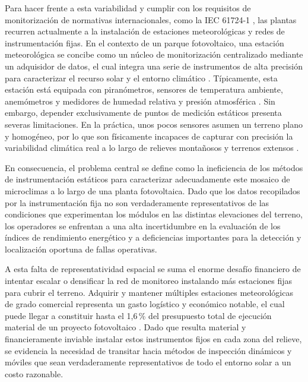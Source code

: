 \documentclass[../../General.tex]{subfiles}
\begin{document}
Para hacer frente a esta variabilidad y cumplir con los requisitos de monitorización de normativas internacionales, como la IEC 61724-1 \citep{IEC61724-1_2021}, las plantas recurren actualmente a la instalación de estaciones meteorológicas y redes de instrumentación fijas. En el contexto de un parque fotovoltaico, una estación meteorológica se concibe como un núcleo de monitorización centralizado mediante un adquisidor de datos, el cual integra una serie de instrumentos de alta precisión para caracterizar el recurso solar y el entorno climático \citep{Anatrac}. Típicamente, esta estación está equipada con piranómetros, sensores de temperatura ambiente, anemómetros y medidores de humedad relativa y presión atmosférica \citep{ProyectoEjecutivo2024}. Sin embargo, depender exclusivamente de puntos de medición estáticos presenta severas limitaciones. En la práctica, unos pocos sensores asumen un terreno plano y homogéneo, por lo que son físicamente incapaces de capturar con precisión la variabilidad climática real a lo largo de relieves montañosos y terrenos extensos \citep{Salinas2025}.

En consecuencia, el problema central se define como la ineficiencia de los métodos de instrumentación estáticos para caracterizar adecuadamente este mosaico de microclimas a lo largo de una planta fotovoltaica. Dado que los datos recopilados por la instrumentación fija no son verdaderamente representativos de las condiciones que experimentan los módulos en las distintas elevaciones del terreno, los operadores se enfrentan a una alta incertidumbre en la evaluación de los índices de rendimiento energético y a deficiencias importantes para la detección y localización oportuna de fallas operativas.

A esta falta de representatividad espacial se suma el enorme desafío financiero de intentar escalar o densificar la red de monitoreo instalando más estaciones fijas para cubrir el terreno. Adquirir y mantener múltiples estaciones meteorológicas de grado comercial representa un gasto logístico y económico notable, el cual puede llegar a constituir hasta el 1,6\,\% del presupuesto total de ejecución material de un proyecto fotovoltaico \citep{Burriana5MW}. Dado que resulta material y financieramente inviable instalar estos instrumentos fijos en cada zona del relieve, se evidencia la necesidad de transitar hacia métodos de inspección dinámicos y móviles que sean verdaderamente representativos de todo el entorno solar a un costo razonable.
\end{document}
